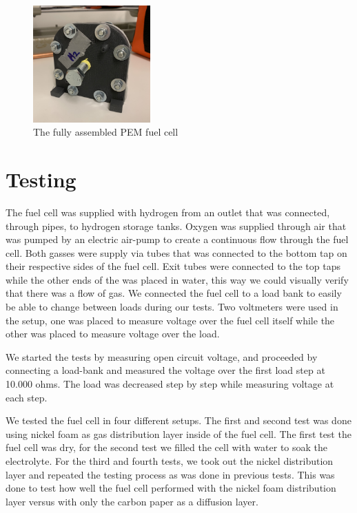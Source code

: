 \begin{figure}[ht]
    \centering
    \includegraphics[width=0.4\textwidth]{DIV./Bilder/Assembly/Fuelcell.jpg}
    \caption{The fully assembled PEM fuel cell}
    \label{fig:FinishedFuelCell}
\end{figure}

\section{Testing}

The fuel cell was supplied with hydrogen from an outlet that was connected, through pipes, to hydrogen storage tanks. Oxygen was supplied through air that was pumped by an electric air-pump to create a continuous flow through the fuel cell. Both gasses were supply via tubes that was connected to the bottom tap on their respective sides of the fuel cell. Exit tubes were connected to the top taps while the other ends of the was placed in water, this way we could visually verify that there was a flow of gas. We connected the fuel cell to a load bank to easily be able to change between loads during our tests. Two voltmeters were used in the setup, one was placed to measure voltage over the fuel cell itself while the other was placed to measure voltage over the load.

We started the tests by measuring open circuit voltage, and proceeded by connecting a load-bank and measured the voltage over the first load step at 10.000 ohms. The load was decreased step by step while measuring voltage at each step.
 
We tested the fuel cell in four different setups. The first and second test was done using nickel foam as gas distribution layer inside of the fuel cell. The first test the fuel cell was dry, for the second test we filled the cell with water to soak the electrolyte. For the third and fourth tests, we took out the nickel distribution layer and repeated the testing process as was done in previous tests. This was done to test how well the fuel cell performed with the nickel foam distribution layer versus with only the carbon paper as a diffusion layer.

